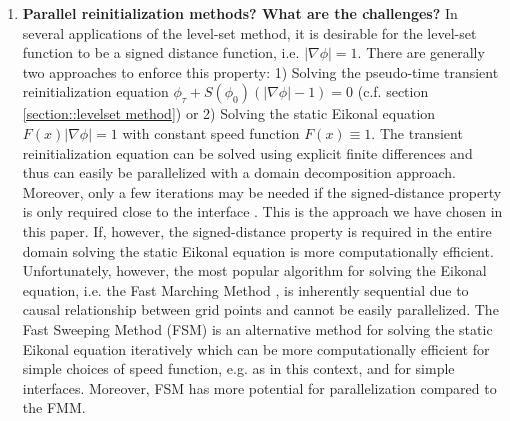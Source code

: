 \begin{enumerate}
\item \textbf{Parallel reinitialization methods? What are the challenges?}
In several applications of the level-set method, it is desirable for the level-set function to be a signed distance function, i.e. $|\nabla \phi| = 1$. There are generally two approaches to enforce this property: 1) Solving the pseudo-time transient reinitialization equation $\phi_\tau + S(\phi_0)\left(|\nabla \phi| - 1\right) = 0$ (c.f. section \ref{section::levelset method}) \cite{Osher;Fedkiw:01:Level-Set-Methods:-A}  or 2) Solving the static Eikonal equation $F(x)|\nabla\phi| = 1$ with constant speed function $F(x) \equiv 1$. The transient reinitialization equation can be solved using explicit finite differences and thus can easily be parallelized with a domain decomposition approach. Moreover, only a few iterations may be needed if the signed-distance property is only required close to the interface \cite{Min;Gibou:07:A-second-order-accur}. This is the approach we have chosen in this paper. If, however, the signed-distance property is required in the entire domain solving the static Eikonal equation is more computationally efficient. Unfortunately, however, the most popular algorithm for solving the Eikonal equation, i.e. the Fast Marching Method \cite{Sethian:96:A-Fast-Marching-Leve,Sethian:99:Level-set-methods-an}, is inherently sequential due to causal relationship between grid points and cannot be easily parallelized. The Fast Sweeping Method (FSM) \cite{Zhao:05:A-fast-sweeping-meth} is an alternative method for solving the static Eikonal equation iteratively which can be more computationally efficient for simple choices of speed function, e.g. as in this context, and for simple interfaces. Moreover, FSM has more potential for parallelization compared to the FMM.


\end{enumerate}
